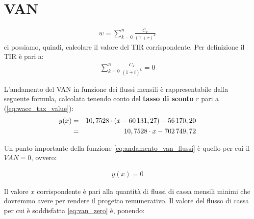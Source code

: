 \section[VAN]{VAN}
	\begin{equation}
	\label{eq:van}
	\begin{split}
 		w = \sum_{k=0}^n \frac{C_k}{(1+r)^k}
	\end{split}
	\end{equation}
	ci possiamo, quindi, calcolare il valore del \ac{TIR} corrispondente. Per definizione il \ac{TIR} è pari a:
	\begin{equation}
	\label{eq:tir}
	\begin{split}
 		\sum_{k=0}^n \frac{C_k}{(1+i)^k} = 0
	\end{split}
	\end{equation}	 

	L'andamento del \ac{VAN} in funzione dei flussi mensili è rappresentabile dalla seguente formula, calcolata tenendo conto del \textbf{tasso di sconto} $r$ pari a (\ref{eq:wacc_tax_value}):	
	\begin{eqnarray}
	\label{eq:andamento_van_flussi}
 		y(x) & = & 10,7528 \cdot ( x - 60\thinspace 131,27 ) - 56\thinspace 170,20		\nonumber \\
 			 & = & 10,7528 \cdot x - 702\thinspace 749,72
	\end{eqnarray}


Un punto importante della funzione \ref{eq:andamento_van_flussi} è quello per cui il $ VAN = 0 $, ovvero:

	\begin{equation}
	\label{eq:van_zero}
	\begin{split}
 		y(x) = 0
 	\end{split}
	\end{equation}

Il valore $x$ corrispondente è pari alla quantità di flussi di cassa mensili minimi che dovremmo avere per rendere il progetto remunerativo. Il valore del flusso di cassa per cui è soddisfatta \ref{eq:van_zero} è, ponendo:
			
